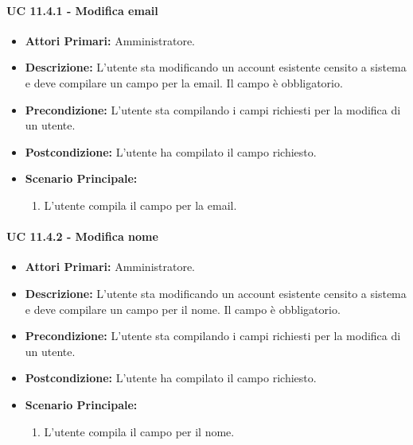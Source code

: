 				\paragraph{UC 11.4.1 - Modifica email}
				\begin{itemize}
					\item \textbf{Attori Primari:} Amministratore.
					\item \textbf{Descrizione:} L'utente sta modificando un account esistente censito a sistema e deve compilare un campo per la email. Il campo è obbligatorio.
					\item \textbf{Precondizione:} L'utente sta compilando i campi richiesti per la modifica di un utente.
					\item \textbf{Postcondizione:} L'utente ha compilato il campo richiesto.
					\item \textbf{Scenario Principale:}
					\begin{enumerate}
						\item{L'utente compila il campo per la email.}
					\end{enumerate}	
				\end{itemize}

				\paragraph{UC 11.4.2 - Modifica nome}
				\begin{itemize}
					\item \textbf{Attori Primari:} Amministratore.
					\item \textbf{Descrizione:} L'utente sta modificando un account esistente censito a sistema e deve compilare un campo per il nome. Il campo è obbligatorio.
					\item \textbf{Precondizione:} L'utente sta compilando i campi richiesti per la modifica di un utente.
					\item \textbf{Postcondizione:} L'utente ha compilato il campo richiesto.
					\item \textbf{Scenario Principale:}
					\begin{enumerate}
						\item{L'utente compila il campo per il nome.}
					\end{enumerate}	
				\end{itemize}

